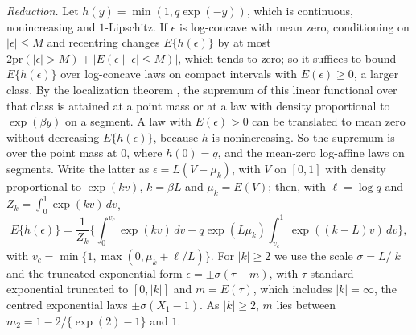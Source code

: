 \documentclass[12pt]{article}
\renewcommand{\_}{\usc\allowbreak}
\theoremstyle{definition}
\numberwithin{equation}{section}
\newcommand{\pr}{\mathrm{pr}}
\begin{document}
\emph{Reduction.} Let $h(y) = \min(1, q\exp(-y))$, which is continuous, nonincreasing and $1$-Lipschitz. If $\epsilon$ is log-concave with mean zero, conditioning on $|\epsilon| \le M$ and recentring changes $E\{h(\epsilon)\}$ by at most $2\pr(|\epsilon| > M) + |E(\epsilon \mid |\epsilon| \le M)|$, which tends to zero; so it suffices to bound $E\{h(\epsilon)\}$ over log-concave laws on compact intervals with $E(\epsilon) \ge 0$, a larger class. By the localization theorem \citep{fradelizi2004}, the supremum of this linear functional over that class is attained at a point mass or at a law with density proportional to $\exp(\beta y)$ on a segment. A law with $E(\epsilon) > 0$ can be translated to mean zero without decreasing $E\{h(\epsilon)\}$, because $h$ is nonincreasing. So the supremum is over the point mass at $0$, where $h(0) = q$, and the mean-zero log-affine laws on segments. Write the latter as $\epsilon = L(V - \mu_k)$, with $V$ on $[0, 1]$ with density proportional to $\exp(kv)$, $k = \beta L$ and $\mu_k = E(V)$; then, with $\ell = \log q$ and $Z_k = \int_0^1\exp(kv)\,dv$,
\[
E\{h(\epsilon)\} = \frac{1}{Z_k}\Big\{\int_0^{v_c}\exp(kv)\,dv + q\exp(L\mu_k)\int_{v_c}^1\exp((k - L)v)\,dv\Big\},
\]
with $v_c = \min\{1, \max(0, \mu_k + \ell/L)\}$.
For $|k| \ge 2$ we use the scale $\sigma = L/|k|$ and the truncated exponential form $\epsilon = \pm\sigma(\tau - m)$, with $\tau$ standard exponential truncated to $[0, |k|]$ and $m = E(\tau)$, which includes $|k| = \infty$, the centred exponential laws $\pm\sigma(X_1 - 1)$. As $|k| \ge 2$, $m$ lies between $m_2 = 1 - 2/\{\exp(2) - 1\}$ and $1$.
\end{document}
